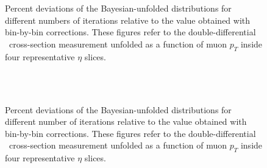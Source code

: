 
\begin{figure}[phtb]
  \begin{center}
         \\ 
        \\
    \caption{Percent deviations of the Bayesian-unfolded distributions for different numbers of iterations 
      relative to the value obtained with bin-by-bin corrections. These figures refer to the double-differential
      \Wmunup\ cross-section measurement unfolded as a function of muon $p_T$ inside four representative $\eta$ slices. }
 \label{fig:Wmunu:unftest_2D_POS}
 \end{center}
\end{figure}

\newpage
\begin{figure}[phtb]
  \begin{center}
         \\ 
        \\
    \caption{Percent deviations of the Bayesian-unfolded distributions for different number of iterations 
      relative to the value obtained with bin-by-bin corrections. These figures refer to the double-differential
      \Wmunum\ cross-section measurement unfolded as a function of muon $p_T$ inside four representative $\eta$ slices. }
 \label{fig:Wmunu:unftest_2D_NEG}
 \end{center}
\end{figure}


